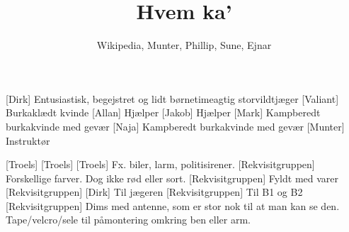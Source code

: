 \documentclass[a4paper,11pt]{article}
\title{Hvem ka'}
\author{Wikipedia, Munter, Phillip, Sune, Ejnar}
\begin{document}
\maketitle

\begin{roles}
	[Dirk] Entusiastisk, begejstret og lidt børnetimeagtig storvildtjæger
	[Valiant] Burkaklædt kvinde
	[Allan] Hjælper
	[Jakob] Hjælper
	[Mark] Kampberedt burkakvinde med gevær
	[Naja] Kampberedt burkakvinde med gevær
	[Munter] Instruktør
\end{roles}

\begin{props}
	[Troels] 
	[Troels]
	[Troels] Fx. biler, larm, politisirener.
	[Rekvisitgruppen] Forskellige farver. Dog ikke rød eller sort.
	[Rekvisitgruppen] Fyldt med varer
	[Rekvisitgruppen] 
	[Dirk] Til jægeren
	[Rekvisitgruppen] Til B1 og B2
	[Rekvisitgruppen] Dims med antenne, som er stor nok til at man kan se den. Tape/velcro/sele til påmontering omkring ben eller arm.
\end{props}
\end{document}
